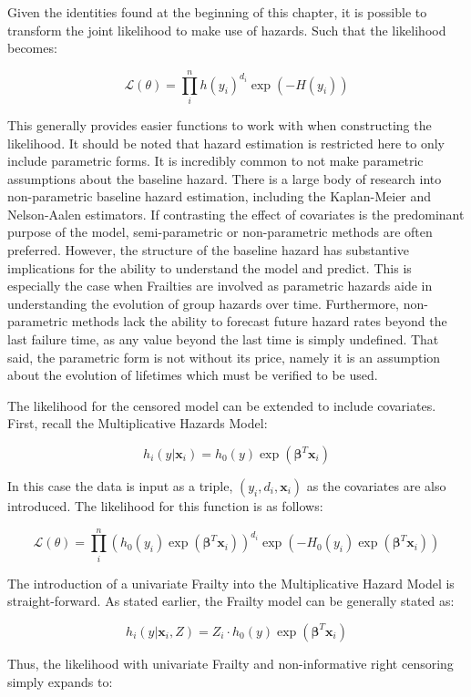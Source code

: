 Given the identities found at the beginning of this chapter, it is possible to transform the joint likelihood to make use of hazards.  Such that the likelihood becomes:

$$ \mathcal {L}(\theta) = \prod^n_i h(y_i)^{d_i} \exp(-H(y_i)) $$

This generally provides easier functions to work with when constructing the likelihood. It should be noted that hazard estimation is restricted here to only include parametric forms. It is incredibly common to not make parametric assumptions about the baseline hazard. There is a large body of research into non-parametric baseline hazard estimation, including the Kaplan-Meier and Nelson-Aalen estimators. If contrasting the effect of covariates is the predominant purpose of the model, semi-parametric or non-parametric methods are often preferred. However, the structure of the baseline hazard has substantive implications for the ability to understand the model and predict. This is especially the case when Frailties are involved as parametric hazards aide in understanding the evolution of group hazards over time. Furthermore, non-parametric methods lack the ability to forecast future hazard rates beyond the last failure time, as any value beyond the last time is simply undefined. That said, the parametric form is not without its price, namely it is an assumption about the evolution of lifetimes which must be verified to be used.

The likelihood for the censored model can be extended to include covariates. First, recall the Multiplicative Hazards Model:

$$ h_i(y|\textbf{x}_i) = h_0(y) \exp(\boldsymbol\beta^T \textbf{x}_i) $$

In this case the data is input as a triple, $(y_i, d_i, \textbf{x}_i)$ as the covariates are also introduced. The likelihood for this function is as follows:

$$ \mathcal {L}(\theta) = \prod^n_i \left (h_0(y_i) \exp(\boldsymbol\beta^T \textbf{x}_i)  \right )^{d_i} \exp(-H_0(y_i) \exp(\boldsymbol\beta^T \textbf{x}_i)) $$

The introduction of a univariate Frailty into the Multiplicative Hazard Model is straight-forward. As stated earlier, the Frailty model can be generally stated as:

$$ h_{i}(y|\textbf{x}_i, Z) = Z_i \cdot h_0(y) \exp(\boldsymbol\beta^T \textbf{x}_{i})  $$

Thus, the likelihood with univariate Frailty and non-informative right censoring simply expands to:

